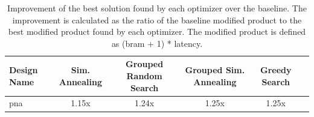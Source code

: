 \begin{table}[th]
\caption{Improvement of the best solution found by each optimizer over the baseline. The improvement is calculated as the ratio of the baseline modified product to the best modified product found by each optimizer. The modified product is defined as (bram + 1) * latency.}
\label{tab:improvement}
\begin{tabular}{lccccc}
\toprule
Design Name & Sim. Annealing & Grouped Random Search & Grouped Sim. Annealing & Greedy Search \\
\midrule
pna & 1.15x & 1.24x & 1.25x & 1.25x \\
\bottomrule
\end{tabular}
\end{table}
